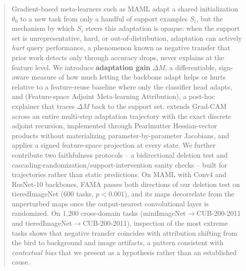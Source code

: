 \begin{abstract}
    Gradient-based meta-learners such as MAML adapt a shared initialization $\theta_0$ to a new task from only a handful of support examples $S_i$, but the mechanism by which $S_i$ steers this adaptation is opaque: when the support set is unrepresentative, hard, or out-of-distribution, adaptation can actively \emph{hurt} query performance, a phenomenon known as negative transfer that prior work detects only through accuracy drops, never explains at the feature level. We introduce \textbf{adaptation gain} $\Delta M$, a differentiable, sign-aware measure of how much letting the backbone adapt helps or hurts relative to a feature-reuse baseline where only the classifier head adapts, and \textbf{\fama} (Feature-space Adjoint Meta-learning Attribution), a post-hoc explainer that traces $\Delta M$ back to the support set. \fama extends Grad-CAM across an entire multi-step adaptation trajectory with the exact discrete adjoint recursion, implemented through Pearlmutter Hessian-vector products without materializing parameter-by-parameter Jacobians, and applies a signed feature-space projection at every state. We further contribute two faithfulness protocols -- a bidirectional deletion test and cascading-randomization/support-intervention sanity checks -- built for trajectories rather than static predictions. On MAML with Conv4 and ResNet-10 backbones, FAMA passes both directions of our deletion test on tieredImageNet (600 tasks, $p < 0.001$), and its maps decorrelate from the unperturbed maps once the output-nearest convolutional layer is randomized. On 1,200 cross-domain tasks (miniImageNet$\to$CUB-200-2011 and tieredImageNet$\to$CUB-200-2011), inspection of the most extreme tasks shows that negative transfer coincides with attribution shifting from the bird to background and image artifacts, a pattern consistent with \emph{contextual bias} that we present as a hypothesis rather than an established cause.
\end{abstract}
